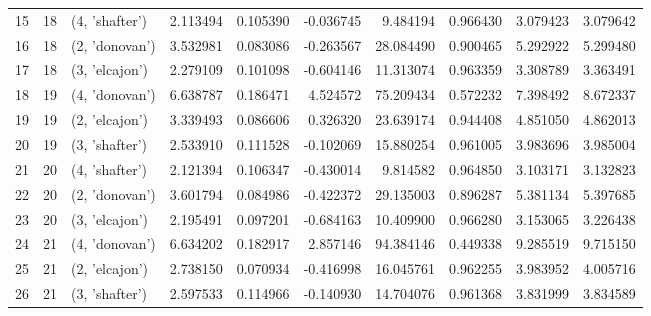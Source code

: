 \begin{tabular}{lrlrrrrrrr}
15 &     18 &  (4, 'shafter') &  2.113494 &  0.105390 & -0.036745 &    9.484194 &  0.966430 &   3.079423 &   3.079642 \\
16 &     18 &  (2, 'donovan') &  3.532981 &  0.083086 & -0.263567 &   28.084490 &  0.900465 &   5.292922 &   5.299480 \\
17 &     18 &  (3, 'elcajon') &  2.279109 &  0.101098 & -0.604146 &   11.313074 &  0.963359 &   3.308789 &   3.363491 \\
18 &     19 &  (4, 'donovan') &  6.638787 &  0.186471 &  4.524572 &   75.209434 &  0.572232 &   7.398492 &   8.672337 \\
19 &     19 &  (2, 'elcajon') &  3.339493 &  0.086606 &  0.326320 &   23.639174 &  0.944408 &   4.851050 &   4.862013 \\
20 &     19 &  (3, 'shafter') &  2.533910 &  0.111528 & -0.102069 &   15.880254 &  0.961005 &   3.983696 &   3.985004 \\
21 &     20 &  (4, 'shafter') &  2.121394 &  0.106347 & -0.430014 &    9.814582 &  0.964850 &   3.103171 &   3.132823 \\
22 &     20 &  (2, 'donovan') &  3.601794 &  0.084986 & -0.422372 &   29.135003 &  0.896287 &   5.381134 &   5.397685 \\
23 &     20 &  (3, 'elcajon') &  2.195491 &  0.097201 & -0.684163 &   10.409900 &  0.966280 &   3.153065 &   3.226438 \\
24 &     21 &  (4, 'donovan') &  6.634202 &  0.182917 &  2.857146 &   94.384146 &  0.449338 &   9.285519 &   9.715150 \\
25 &     21 &  (2, 'elcajon') &  2.738150 &  0.070934 & -0.416998 &   16.045761 &  0.962255 &   3.983952 &   4.005716 \\
26 &     21 &  (3, 'shafter') &  2.597533 &  0.114966 & -0.140930 &   14.704076 &  0.961368 &   3.831999 &   3.834589 \\
\bottomrule
\end{tabular}
